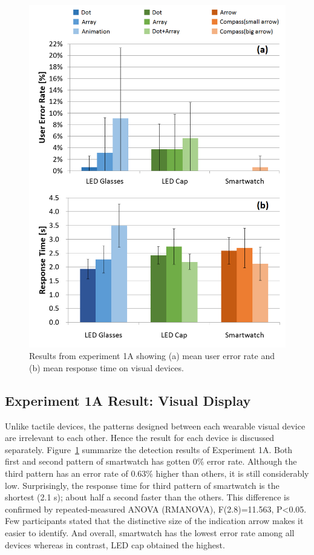 \documentclass{sigchi}
\begin{document}
\begin{figure}[!t]
\centering
\includegraphics[width=0.9\columnwidth]{stage1_Visual_ER&RT}
\caption{Results from experiment 1A showing (a) mean user error rate and (b) mean response time on visual devices.}
\label{fig:visual_ER&RT}
\end{figure}


\subsection{Experiment 1A Result: Visual Display}
Unlike tactile devices, the patterns designed between each wearable visual device are irrelevant to each other. Hence the result for each device is discussed separately. Figure~\ref{fig:visual_ER&RT} summarize the detection results of Experiment 1A. Both first and second pattern of smartwatch has gotten 0\% error rate. Although the third pattern has an error rate of 0.63\% higher than others, it is still considerably low. Surprisingly, the response time for third pattern of smartwatch is the shortest (2.1 s); about half a second faster than the others. This difference is confirmed by repeated-measured ANOVA (RMANOVA), F(2.8)=11.563, P\textless0.05. Few participants stated that the distinctive size of the indication arrow makes it easier to identify. And overall, smartwatch has the lowest error rate among all devices whereas in contrast, LED cap obtained the highest.
\end{document}
